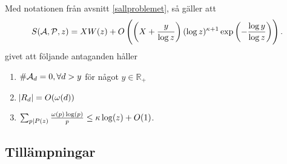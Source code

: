 \begin{theorem}\label{thm:EratosthenesSieve}
Med notationen från avsnitt \ref{sallproblemet}, så gäller att
\begin{align*}
    \S{A}{P}{z} = X W(z) + O\left(\left(X + \frac{y}{\log z} \right) (\log z)^{\kappa + 1} \exp{\left(-\frac{\log y}{\log z}\right)} \right). 
\end{align*}
givet att följande antaganden håller
\begin{enumerate}
    \item \(\card{\A_d} = 0, \forall d > y\) för något \(y \in \mathbb{R}_+\)
    \item \(\abs{R_d} = O(\omega(d))\)
    \item \(\sum_{p \divides P(z)} \frac{\omega(p) \log(p)}{p} \leq \kappa \log(z) + O(1)\).
\end{enumerate}

\end{theorem}

\subsection{Tillämpningar}


